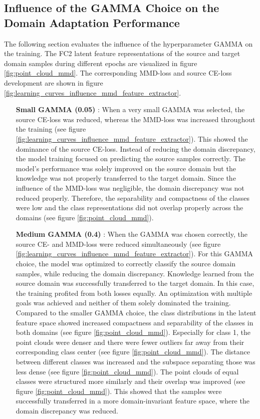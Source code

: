 \subsection{Influence of the GAMMA Choice on the Domain Adaptation Performance} \label{sec:Balancing Cross-Entropy and MMD loss}

The following section evaluates the influence of the hyperparameter GAMMA on the training. The FC2 latent feature representations of the source and target domain samples during different epochs are visualized in figure \ref{fig:point_cloud_mmd}. The corresponding MMD-loss and source CE-loss development are shown in figure \ref{fig:learning_curves_influence_mmd_feature_extractor}.
\begin{itemize}
    \item [\textbf{Small GAMMA (0.05)}]:
    When a very small GAMMA was selected, the source CE-loss was reduced, whereas the MMD-loss was increased throughout the training (see figure \ref{fig:learning_curves_influence_mmd_feature_extractor}). This showed the dominance of the source CE-loss. Instead of reducing the domain discrepancy, the model training focused on predicting the source samples correctly. The model's performance was solely improved on the source domain but the knowledge was not properly transferred to the target domain. Since the influence of the MMD-loss was negligible, the domain discrepancy was not reduced properly. Therefore, the separability and compactness of the classes were low and the class representations did not overlap properly across the domains (see figure \ref{fig:point_cloud_mmd}).
    \item [\textbf{Medium GAMMA (0.4)}]:
    When the GAMMA was chosen correctly, the source CE- and MMD-loss were reduced simultaneously (see figure \ref{fig:learning_curves_influence_mmd_feature_extractor}). For this GAMMA choice, the model was optimized to correctly classify the source domain samples, while reducing the domain discrepancy. Knowledge learned from the source domain was successfully transferred to the target domain. In this case, the training profited from both losses equally. An optimization with multiple goals was achieved and neither of them solely dominated the training. Compared to the smaller GAMMA choice, the class distributions in the latent feature space showed increased compactness and separability of the classes in both domains (see figure \ref{fig:point_cloud_mmd}). Especially for class 1, the point clouds were denser and there were fewer outliers far away from their corresponding class center (see figure \ref{fig:point_cloud_mmd}). The distance between different classes was increased and the subspace separating those was less dense (see figure \ref{fig:point_cloud_mmd}). The point clouds of equal classes were structured more similarly and their overlap was improved (see figure \ref{fig:point_cloud_mmd}). This showed that the samples were successfully transferred in a more domain-invariant feature space, where the domain discrepancy was reduced.

\end{itemize}
